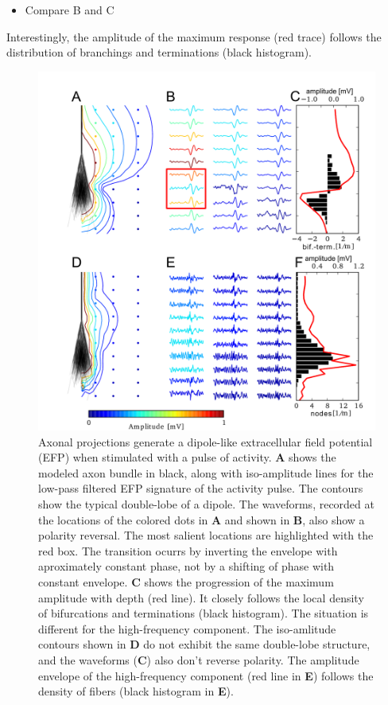 \documentclass[]{article}
\providecommand{\tightlist}{%
  \setlength{\itemsep}{0pt}\setlength{\parskip}{0pt}}
\begin{document}
\begin{itemize}
\tightlist
\item
  Compare B and C
\end{itemize}

Interestingly, the amplitude of the maximum response (red trace) follows
the distribution of branchings and terminations (black histogram).

\begin{figure}[htbp]
\centering
\includegraphics{../figs/fig_1.pdf}
\caption{Axonal projections generate a dipole-like extracellular field
potential (EFP) when stimulated with a pulse of activity. \textbf{A}
shows the modeled axon bundle in black, along with iso-amplitude lines
for the low-pass filtered EFP signature of the activity pulse. The
contours show the typical double-lobe of a dipole. The waveforms,
recorded at the locations of the colored dots in \textbf{A} and shown in
\textbf{B}, also show a polarity reversal. The most salient locations
are highlighted with the red box. The transition ocurrs by inverting the
envelope with aproximately constant phase, not by a shifting of phase
with constant envelope. \textbf{C} shows the progression of the maximum
amplitude with depth (red line). It closely follows the local density of
bifurcations and terminations (black histogram). The situation is
different for the high-frequency component. The iso-amlitude contours
shown in \textbf{D} do not exhibit the same double-lobe structure, and
the waveforms (\textbf{C}) also don't reverse polarity. The amplitude
envelope of the high-frequency component (red line in \textbf{E})
follows the density of fibers (black histogram in \textbf{E}).}
\end{figure}
\end{document}
